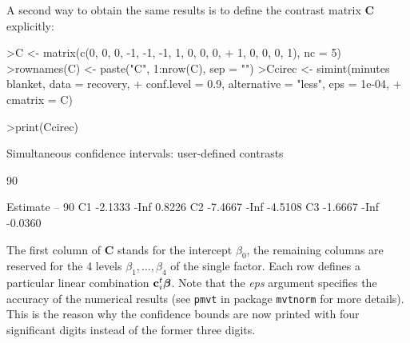 \documentclass{article}
\newcommand{\bbeta}{\mbox{\boldmath $\beta$}}
\newcommand{\bc}{{\mathbf{c}}}
\newcommand{\bC}{{\mathbf{C}}}
\begin{document}
A second way to obtain the same results is to define the contrast
matrix $\bC$ explicitly:
\small
\begin{Schunk}
\begin{Sinput}
>C <- matrix(c(0, 0, 0, -1, -1, -1, 1, 0, 0, 0, 
+     1, 0, 0, 0, 1), nc = 5)
>rownames(C) <- paste("C", 1:nrow(C), sep = "")
>Ccirec <- simint(minutes ~ blanket, data = recovery, 
+     conf.level = 0.9, alternative = "less", eps = 1e-04, 
+     cmatrix = C)
\end{Sinput}
\end{Schunk}
\begin{Schunk}
\begin{Sinput}
>print(Ccirec)
\end{Sinput}
\begin{Soutput}
	Simultaneous confidence intervals: user-defined
	contrasts

	90 % confidence intervals

   Estimate   --    90 %
C1  -2.1333 -Inf  0.8226
C2  -7.4667 -Inf -4.5108
C3  -1.6667 -Inf -0.0360
\end{Soutput}
\end{Schunk}
\normalsize
The first column of $\bC$ stands for the intercept $\beta_0$, the
remaining columns are reserved for the 4 levels $\beta_1, \dots,
\beta_4$ of the single factor. Each row defines a particular
linear combination $\bc_i^t \bbeta$. Note that the {\em eps} argument
specifies the accuracy of the numerical results (see \texttt{pmvt} in package
\texttt{mvtnorm} for more details). This is the reason why
the confidence bounds are now printed with four significant digits 
instead of the former three digits.
\end{document}
